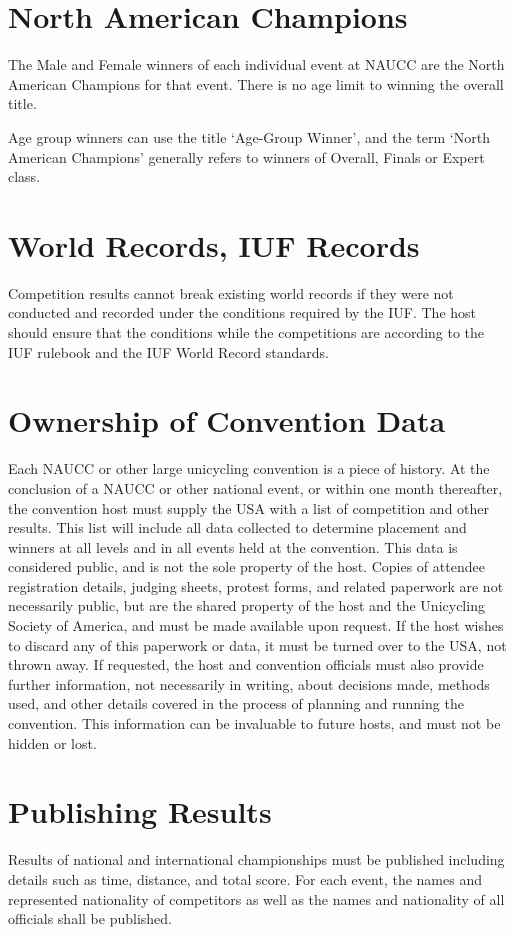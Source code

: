 \section{North American Champions}
The Male and Female winners of each individual event at NAUCC are the North American Champions for that event. 
There is no age limit to winning the overall title.

Age group winners can use the title `Age-Group Winner', and the term `North American Champions' generally refers to winners of Overall, Finals or Expert class.


\section{World Records, IUF Records}
Competition results cannot break existing world records if they were not conducted and recorded under the conditions required by the IUF.
The host should ensure that the conditions while the competitions are according to the IUF rulebook and the IUF World Record standards.

\section{Ownership of Convention Data}
Each NAUCC or other large unicycling convention is a piece of history.
At the conclusion of a NAUCC or other national event, or within one month thereafter, the convention host must supply the USA with a list of competition and other results.
This list will include all data collected to determine placement and winners at all levels and in all events held at the convention.
This data is considered public, and is not the sole property of the host.
Copies of attendee registration details, judging sheets, protest forms, and related paperwork are not necessarily public, but are the shared property of the host and the Unicycling Society of America, and must be made available upon request.
If the host wishes to discard any of this paperwork or data, it must be turned over to the USA, not thrown away.
If requested, the host and convention officials must also provide further information, not necessarily in writing, about decisions made, methods used, and other details covered in the process of planning and running the convention.
This information can be invaluable to future hosts, and must not be hidden or lost.

\section{Publishing Results}
Results of national and international championships must be published including details such as time, distance, and total score.
For each event, the names and represented nationality of competitors as well as the names and nationality of all officials shall be published.

